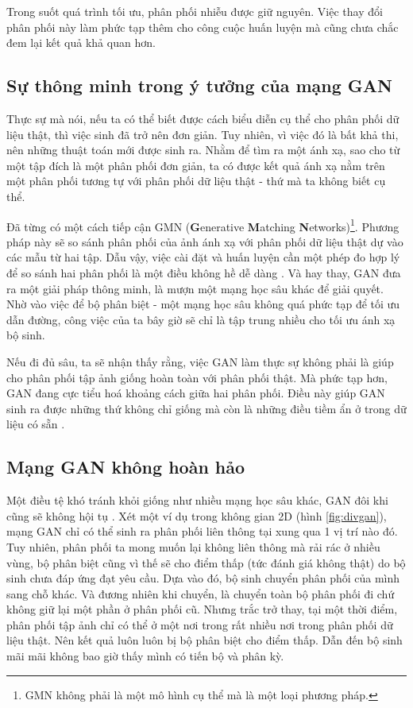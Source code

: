 \documentclass[a4paper, 12pt]{report}
\begin{document}
Trong suốt quá trình tối ưu, phân phối nhiễu được giữ nguyên.
Việc thay đổi phân phối này làm phức tạp thêm cho công cuộc huấn luyện mà cũng chưa chắc đem lại kết quả khả quan hơn.

\subsection{Sự thông minh trong ý tưởng của mạng GAN}

Thực sự mà nói, nếu ta có thể biết được cách biểu diễn cụ thể cho phân phối dữ liệu thật, thì việc sinh đã trở nên đơn giản.
Tuy nhiên, vì việc đó là bất khả thi, nên những thuật toán mới được sinh ra.
Nhằm để tìm ra một ánh xạ, sao cho từ một tập đích là một phân phối đơn giản, ta có được kết quả ánh xạ nằm trên một phân phối tương tự với phân phối dữ liệu thật - thứ mà ta không biết cụ thể.\vspace{5pt}

Đã từng có một cách tiếp cận GMN (\textbf{G}enerative \textbf{M}atching \textbf{N}etworks)\footnote{GMN không phải là một mô hình cụ thể mà là một loại phương pháp.}.
Phương pháp này sẽ so sánh phân phối của ảnh ánh xạ với phân phối dữ liệu thật dự vào các mẫu từ hai tập.
Dẫu vậy, việc cài đặt và huấn luyện cần một phép đo hợp lý để so sánh hai phân phối là một điều không hề dễ dàng \cite{replyganovergmn2019}.
Và hay thay, GAN đưa ra một giải pháp thông minh, là mượn một mạng học sâu khác để giải quyết.
Nhờ vào việc để bộ phân biệt - một mạng học sâu không quá phức tạp để tối ưu dẫn đường, công việc của ta bây giờ sẽ chỉ là tập trung nhiều cho tối ưu ánh xạ bộ sinh.\vspace{5pt}

Nếu đi đủ sâu, ta sẽ nhận thấy rằng, việc GAN làm thực sự không phải là giúp cho phân phối tập ảnh giống hoàn toàn với phân phối thật.
Mà phức tạp hơn, GAN đang cực tiểu hoá khoảng cách giữa hai phân phối.
Điều này giúp GAN sinh ra được những thứ không chỉ giống mà còn là những điều tiềm ẩn ở trong dữ liệu có sẵn \cite{gregoiregan2019}.

\subsection{Mạng GAN không hoàn hảo}

Một điều tệ khó tránh khỏi giống như nhiều mạng học sâu khác, GAN đôi khi cũng sẽ không hội tụ \cite{barnett2018convergence}.
Xét một ví dụ trong không gian 2D (hình \ref{fig:divgan}), mạng GAN chỉ có thể sinh ra phân phối liên thông tại xung qua 1 vị trí nào đó.
Tuy nhiên, phân phối ta mong muốn lại không liên thông mà rải rác ở nhiều vùng, bộ phân biệt cũng vì thế sẽ cho điểm thấp (tức đánh giá không thật) do bộ sinh chưa đáp ứng đạt yêu cầu.
Dựa vào đó, bộ sinh chuyển phân phối của mình sang chỗ khác.
Và đương nhiên khi chuyển, là chuyển toàn bộ phân phối đi chứ không giữ lại một phần ở phân phối cũ.
Nhưng trắc trở thay, tại một thời điểm, phân phối tập ảnh chỉ có thể ở một nơi trong rất nhiều nơi trong phân phối dữ liệu thật.
Nên kết quả luôn luôn bị bộ phân biệt cho điểm thấp.
Dẫn đến bộ sinh mãi mãi không bao giờ thấy mình có tiến bộ và phân kỳ.
\end{document}
